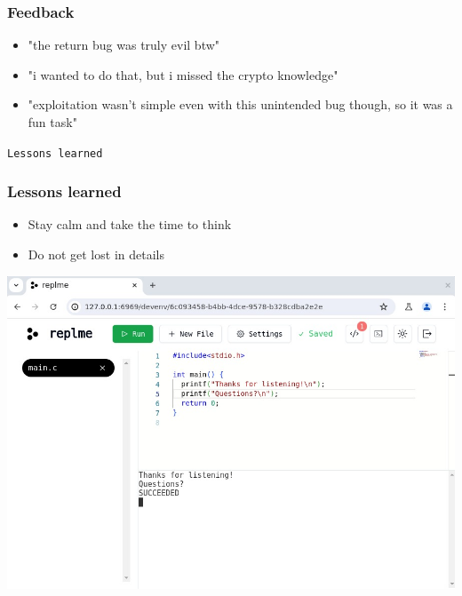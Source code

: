 \documentclass[10pt]{beamer}
\begin{document}
\begin{frame}
	\frametitle{Feedback}
	\begin{itemize}
		\item<1-> "the return bug was truly evil btw"
		\item<2-> "i wanted to do that, but i missed the crypto knowledge"
		\item<3-> "exploitation wasn't simple even with this unintended bug though, so it was a fun task"
	\end{itemize}
\end{frame}

\begin{frame}
	\begin{center}
		\LARGE{\texttt{Lessons learned}}
	\end{center}
\end{frame}

\begin{frame}
	\frametitle{Lessons learned}
	\begin{itemize}
		\item<1-> Stay calm and take the time to think
		\item<2-> Do not get lost in details
	\end{itemize}
\end{frame}

\begin{frame}
	\begin{center}
		\includegraphics[scale=0.29]{thanks}
	\end{center}
\end{frame}
\end{document}
